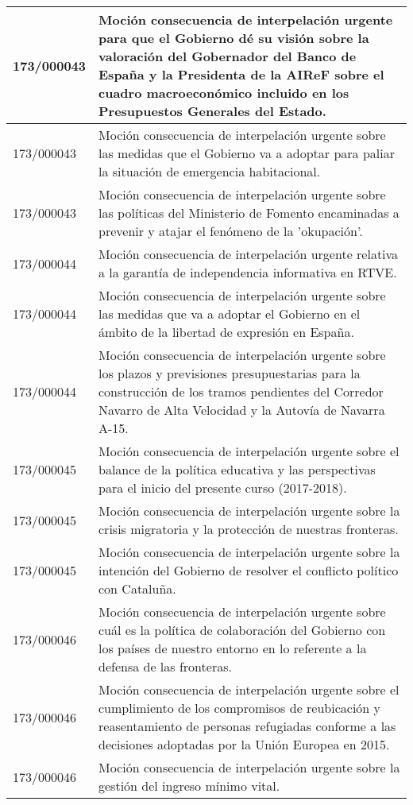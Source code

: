 {\begin{table}[H]
\begin{center}
\begin{tabularx}{\linewidth}{| l | X |}
\hline
173/000043 & Moción consecuencia de interpelación urgente para que el Gobierno dé su visión sobre la valoración del Gobernador del Banco de España y la Presidenta de la AIReF sobre el cuadro macroeconómico incluido en los Presupuestos Generales del Estado. \\
\hline
173/000043 & Moción consecuencia de interpelación urgente sobre las medidas que el Gobierno va a adoptar para paliar la situación de emergencia habitacional. \\
\hline
173/000043 & Moción consecuencia de interpelación urgente sobre las políticas del Ministerio de Fomento encaminadas a prevenir y atajar el fenómeno de la 'okupación'. \\
\hline
173/000044 & Moción consecuencia de interpelación urgente relativa a la garantía de independencia informativa en RTVE. \\
\hline
173/000044 & Moción consecuencia de interpelación urgente sobre las medidas que va a adoptar el Gobierno en el ámbito de la libertad de expresión en España. \\
\hline
173/000044 & Moción consecuencia de interpelación urgente sobre los plazos y previsiones presupuestarias para la construcción de los tramos pendientes del Corredor Navarro de Alta Velocidad y la Autovía de Navarra A-15. \\
\hline
173/000045 & Moción consecuencia de interpelación urgente sobre el balance de la política educativa y las perspectivas para el inicio del presente curso (2017-2018). \\
\hline
173/000045 & Moción consecuencia de interpelación urgente sobre la crisis migratoria y la protección de nuestras fronteras. \\
\hline
173/000045 & Moción consecuencia de interpelación urgente sobre la intención del Gobierno de resolver el conflicto político con Cataluña. \\
\hline
173/000046 & Moción consecuencia de interpelación urgente sobre cuál es la política de colaboración del Gobierno con los países de nuestro entorno en lo referente a la defensa de las fronteras. \\
\hline
173/000046 & Moción consecuencia de interpelación urgente sobre el cumplimiento de los compromisos de reubicación y reasentamiento de personas refugiadas conforme a las decisiones adoptadas por la Unión Europea en 2015. \\
\hline
173/000046 & Moción consecuencia de interpelación urgente sobre la gestión del ingreso mínimo vital. \\

\end{tabularx}
\end{center}
\end{table}}
